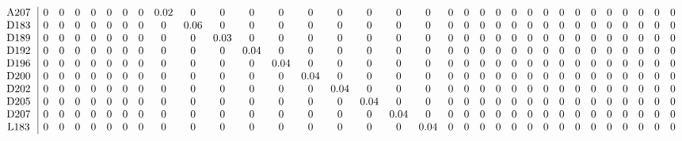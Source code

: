 \begin{table}[H]
\begin{center}
\begin{math}
\begin{array}{c|cccccccccccccccccccccccccccccccc}
\mathrm{A207} \hspace*{2pt} &  0 &  0 &  0 &  0 &  0 &  0 &  0 &       0.02 &  0 &  0 &  0 &  0 &  0 &  0 &  0 &  0 &  0 &  0 &  0 &  0 &  0 &  0 &  0 &  0 &  0 &  0 &  0 &  0 &  0 &  0 &  0 &  0 \\
\mathrm{D183} \hspace*{2pt} &  0 &  0 &  0 &  0 &  0 &  0 &  0 &  0 &       0.06 &  0 &  0 &  0 &  0 &  0 &  0 &  0 &  0 &  0 &  0 &  0 &  0 &  0 &  0 &  0 &  0 &  0 &  0 &  0 &  0 &  0 &  0 &  0 \\
\mathrm{D189} \hspace*{2pt} &  0 &  0 &  0 &  0 &  0 &  0 &  0 &  0 &  0 &       0.03 &  0 &  0 &  0 &  0 &  0 &  0 &  0 &  0 &  0 &  0 &  0 &  0 &  0 &  0 &  0 &  0 &  0 &  0 &  0 &  0 &  0 &  0 \\
\mathrm{D192} \hspace*{2pt} &  0 &  0 &  0 &  0 &  0 &  0 &  0 &  0 &  0 &  0 &       0.04 &  0 &  0 &  0 &  0 &  0 &  0 &  0 &  0 &  0 &  0 &  0 &  0 &  0 &  0 &  0 &  0 &  0 &  0 &  0 &  0 &  0 \\
\mathrm{D196} \hspace*{2pt} &  0 &  0 &  0 &  0 &  0 &  0 &  0 &  0 &  0 &  0 &  0 &       0.04 &  0 &  0 &  0 &  0 &  0 &  0 &  0 &  0 &  0 &  0 &  0 &  0 &  0 &  0 &  0 &  0 &  0 &  0 &  0 &  0 \\
\mathrm{D200} \hspace*{2pt} &  0 &  0 &  0 &  0 &  0 &  0 &  0 &  0 &  0 &  0 &  0 &  0 &       0.04 &  0 &  0 &  0 &  0 &  0 &  0 &  0 &  0 &  0 &  0 &  0 &  0 &  0 &  0 &  0 &  0 &  0 &  0 &  0 \\
\mathrm{D202} \hspace*{2pt} &  0 &  0 &  0 &  0 &  0 &  0 &  0 &  0 &  0 &  0 &  0 &  0 &  0 &       0.04 &  0 &  0 &  0 &  0 &  0 &  0 &  0 &  0 &  0 &  0 &  0 &  0 &  0 &  0 &  0 &  0 &  0 &  0 \\
\mathrm{D205} \hspace*{2pt} &  0 &  0 &  0 &  0 &  0 &  0 &  0 &  0 &  0 &  0 &  0 &  0 &  0 &  0 &       0.04 &  0 &  0 &  0 &  0 &  0 &  0 &  0 &  0 &  0 &  0 &  0 &  0 &  0 &  0 &  0 &  0 &  0 \\
\mathrm{D207} \hspace*{2pt} &  0 &  0 &  0 &  0 &  0 &  0 &  0 &  0 &  0 &  0 &  0 &  0 &  0 &  0 &  0 &       0.04 &  0 &  0 &  0 &  0 &  0 &  0 &  0 &  0 &  0 &  0 &  0 &  0 &  0 &  0 &  0 &  0 \\
\mathrm{L183} \hspace*{2pt} &  0 &  0 &  0 &  0 &  0 &  0 &  0 &  0 &  0 &  0 &  0 &  0 &  0 &  0 &  0 &  0 &       0.04 &  0 &  0 &  0 &  0 &  0 &  0 &  0 &  0 &  0 &  0 &  0 &  0 &  0 &  0 &  0 \\

\end{array}
\end{math}
\end{center}
\end{table}
